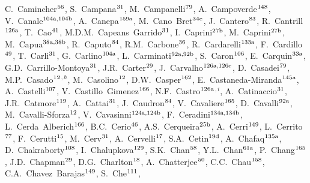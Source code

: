 \begin{flushleft}
C.~Camincher$^\textrm{\scriptsize 56}$,
S.~Campana$^\textrm{\scriptsize 31}$,
M.~Campanelli$^\textrm{\scriptsize 79}$,
A.~Campoverde$^\textrm{\scriptsize 148}$,
V.~Canale$^\textrm{\scriptsize 104a,104b}$,
A.~Canepa$^\textrm{\scriptsize 159a}$,
M.~Cano~Bret$^\textrm{\scriptsize 34e}$,
J.~Cantero$^\textrm{\scriptsize 83}$,
R.~Cantrill$^\textrm{\scriptsize 126a}$,
T.~Cao$^\textrm{\scriptsize 41}$,
M.D.M.~Capeans~Garrido$^\textrm{\scriptsize 31}$,
I.~Caprini$^\textrm{\scriptsize 27b}$,
M.~Caprini$^\textrm{\scriptsize 27b}$,
M.~Capua$^\textrm{\scriptsize 38a,38b}$,
R.~Caputo$^\textrm{\scriptsize 84}$,
R.M.~Carbone$^\textrm{\scriptsize 36}$,
R.~Cardarelli$^\textrm{\scriptsize 133a}$,
F.~Cardillo$^\textrm{\scriptsize 49}$,
T.~Carli$^\textrm{\scriptsize 31}$,
G.~Carlino$^\textrm{\scriptsize 104a}$,
L.~Carminati$^\textrm{\scriptsize 92a,92b}$,
S.~Caron$^\textrm{\scriptsize 106}$,
E.~Carquin$^\textrm{\scriptsize 33a}$,
G.D.~Carrillo-Montoya$^\textrm{\scriptsize 31}$,
J.R.~Carter$^\textrm{\scriptsize 29}$,
J.~Carvalho$^\textrm{\scriptsize 126a,126c}$,
D.~Casadei$^\textrm{\scriptsize 79}$,
M.P.~Casado$^\textrm{\scriptsize 12}$$^{,h}$,
M.~Casolino$^\textrm{\scriptsize 12}$,
D.W.~Casper$^\textrm{\scriptsize 162}$,
E.~Castaneda-Miranda$^\textrm{\scriptsize 145a}$,
A.~Castelli$^\textrm{\scriptsize 107}$,
V.~Castillo~Gimenez$^\textrm{\scriptsize 166}$,
N.F.~Castro$^\textrm{\scriptsize 126a}$$^{,i}$,
A.~Catinaccio$^\textrm{\scriptsize 31}$,
J.R.~Catmore$^\textrm{\scriptsize 119}$,
A.~Cattai$^\textrm{\scriptsize 31}$,
J.~Caudron$^\textrm{\scriptsize 84}$,
V.~Cavaliere$^\textrm{\scriptsize 165}$,
D.~Cavalli$^\textrm{\scriptsize 92a}$,
M.~Cavalli-Sforza$^\textrm{\scriptsize 12}$,
V.~Cavasinni$^\textrm{\scriptsize 124a,124b}$,
F.~Ceradini$^\textrm{\scriptsize 134a,134b}$,
L.~Cerda~Alberich$^\textrm{\scriptsize 166}$,
B.C.~Cerio$^\textrm{\scriptsize 46}$,
A.S.~Cerqueira$^\textrm{\scriptsize 25b}$,
A.~Cerri$^\textrm{\scriptsize 149}$,
L.~Cerrito$^\textrm{\scriptsize 77}$,
F.~Cerutti$^\textrm{\scriptsize 15}$,
M.~Cerv$^\textrm{\scriptsize 31}$,
A.~Cervelli$^\textrm{\scriptsize 17}$,
S.A.~Cetin$^\textrm{\scriptsize 19d}$,
A.~Chafaq$^\textrm{\scriptsize 135a}$,
D.~Chakraborty$^\textrm{\scriptsize 108}$,
I.~Chalupkova$^\textrm{\scriptsize 129}$,
S.K.~Chan$^\textrm{\scriptsize 58}$,
Y.L.~Chan$^\textrm{\scriptsize 61a}$,
P.~Chang$^\textrm{\scriptsize 165}$,
J.D.~Chapman$^\textrm{\scriptsize 29}$,
D.G.~Charlton$^\textrm{\scriptsize 18}$,
A.~Chatterjee$^\textrm{\scriptsize 50}$,
C.C.~Chau$^\textrm{\scriptsize 158}$,
C.A.~Chavez~Barajas$^\textrm{\scriptsize 149}$,
S.~Che$^\textrm{\scriptsize 111}$,

\end{flushleft}
